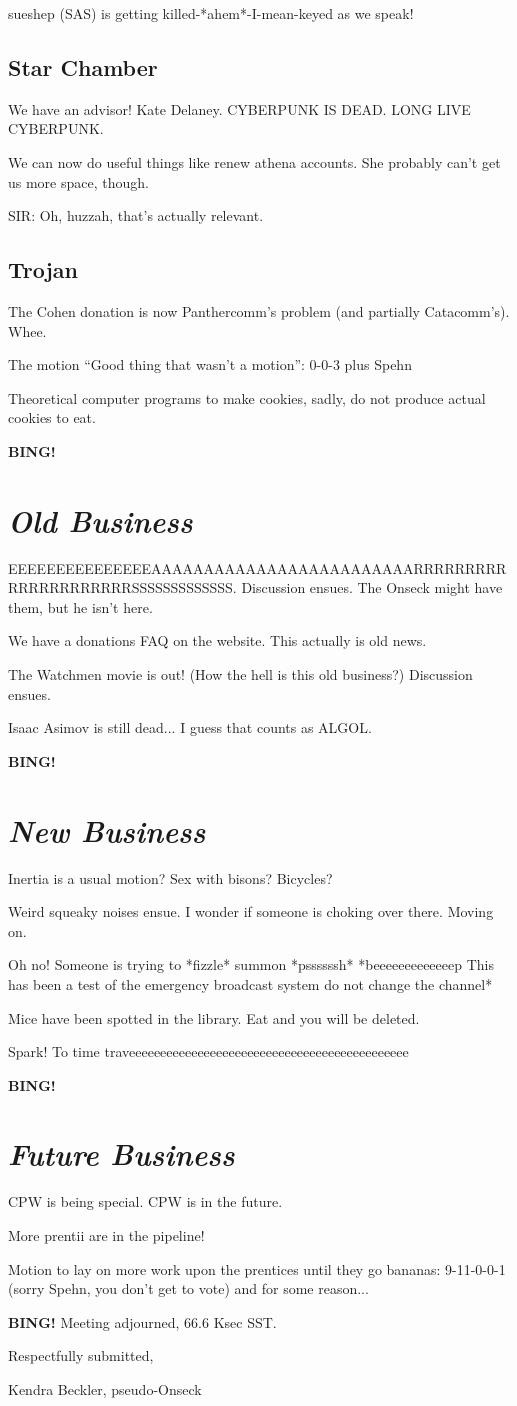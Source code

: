 \documentclass[10pt]{article}
\newcommand{\bing}{{\bf BING!} }
\newcommand{\goto}[1]{\bing \vskip 12pt \section*{{\em{#1}}}}
\newcommand{\ps}{ plus Spehn\xspace}
\begin{document}
sueshep (SAS) is getting killed-*ahem*-I-mean-keyed as we speak!

\subsection*{Star Chamber}

We have an advisor!  Kate Delaney.  CYBERPUNK IS DEAD.  LONG LIVE CYBERPUNK.

We can now do useful things like renew athena accounts.  She probably can't get us more space, though.

SIR: Oh, huzzah, that's actually relevant.

\subsection*{Trojan}

The Cohen donation is now Panthercomm's problem (and partially Catacomm's).  Whee.

The motion ``Good thing that wasn't a motion'': 0-0-3 \ps

Theoretical computer programs to make cookies, sadly, do not produce actual cookies to eat.

\goto{Old Business}

EEEEEEEEEEEEEEEAAAAAAAAAAAAAAAAAAAAAAAAARRRRRRRRRRRRRRRRRRRRRSSSSSSSSSSSSS.  Discussion ensues.  The Onseck might have them, but he isn't here.

We have a donations FAQ on the website.  This actually is old news.

The Watchmen movie is out!  (How the hell is this old business?)  Discussion ensues.

Isaac Asimov is still dead... I guess that counts as ALGOL.

\goto{New Business}

Inertia is a usual motion?  Sex with bisons?  Bicycles?

Weird squeaky noises ensue.  I wonder if someone is choking over there.  Moving on.

Oh no!  Someone is trying to *fizzle* summon *pssssssh* *beeeeeeeeeeeeep This has been a test of the emergency broadcast system do not change the channel*

Mice have been spotted in the library.  Eat and you will be deleted.

Spark!  To time traveeeeeeeeeeeeeeeeeeeeeeeeeeeeeeeeeeeeeeeeeeeee

\goto{Future Business}

CPW is being special.  CPW is in the future.

More prentii are in the pipeline!

Motion to lay on more work upon the prentices until they go bananas: 9-11-0-0-1 (sorry Spehn, you don't get to vote) and for some reason...

\bing
\noindent
Meeting adjourned, 66.6 Ksec SST.

\vspace{18pt}

\centerline{Respectfully submitted,}
\centerline{Kendra Beckler, pseudo-Onseck}
\end{document}
